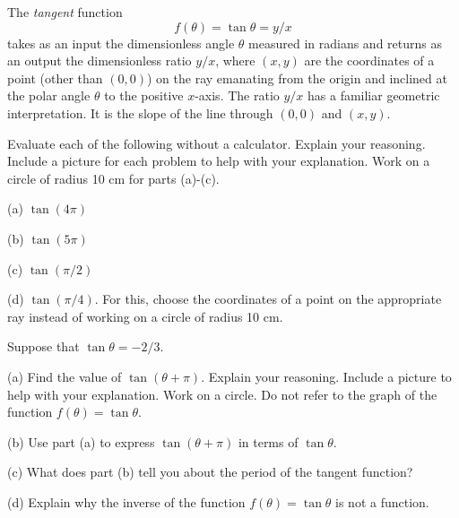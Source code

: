 \documentclass{ximera}
\begin{document}
The \emph{tangent} function 
\[
   f(\theta) = \tan \theta = y/x
\]
takes as an input the dimensionless angle $\theta$ measured in radians and returns as an output the dimensionless ratio $y/x$, where $(x,y)$ are the coordinates of a point (other than $(0,0)$) on the ray emanating from the origin and inclined at the polar angle $\theta$ to the positive $x$-axis. The ratio $y/x$ has a familiar geometric interpretation. It is the slope of the line through $(0,0)$ and $(x,y)$.

\begin{exploration}\label{Exp3:Comp}

 
\begin{onlineOnly}
    \begin{center}
\end{center}
\end{onlineOnly}
\end{exploration}



\begin{question}   \label{Q9:InverseTrig}
Evaluate each of the following without a calculator. Explain your reasoning. Include a picture for each problem to help with your explanation. Work on a circle of radius 10 cm for parts (a)-(c).

(a) $\tan (4\pi)$

(b) $\tan (5\pi)$

(c) $\tan (\pi/2)$

(d) $\tan (\pi/4)$. For this, choose the coordinates of a point on the appropriate ray instead of working on a circle of radius 10 cm.

\end{question}


\begin{question}   \label{Q11:InverseTrig}
Suppose that $\tan\theta = -2/3$.

(a) Find the value of $\tan (\theta + \pi)$. Explain your reasoning. Include a picture to help with your explanation. Work on a circle. Do not refer to the graph of the function $f(\theta) = \tan\theta$.

(b) Use part (a) to express $\tan(\theta + \pi)$ in terms of $\tan\theta$. 

(c) What does part (b) tell you about the period of the tangent function?

(d) Explain why the inverse of the function $f(\theta) = \tan\theta$ is not a function.

\end{question}
\end{document}
